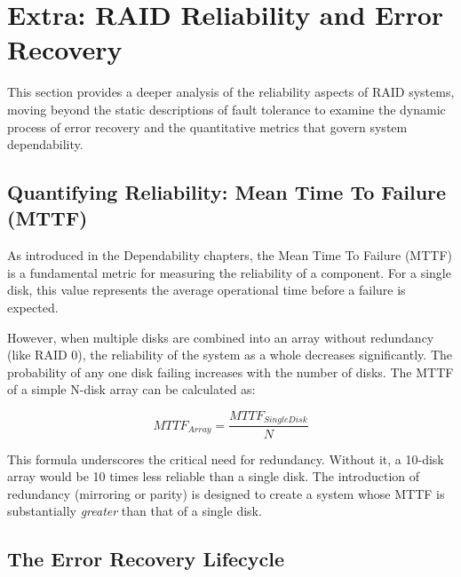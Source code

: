 \chapter*{Extra: RAID Reliability and Error Recovery}
\label{chap:extra_raid_reliability}

This section provides a deeper analysis of the reliability aspects of RAID systems, moving beyond the static descriptions of fault tolerance to examine the dynamic process of error recovery and the quantitative metrics that govern system dependability.

\section{Quantifying Reliability: Mean Time To Failure (MTTF)}

As introduced in the Dependability chapters, the Mean Time To Failure (MTTF) is a fundamental metric for measuring the reliability of a component. For a single disk, this value represents the average operational time before a failure is expected.

However, when multiple disks are combined into an array without redundancy (like RAID 0), the reliability of the system as a whole decreases significantly. The probability of any one disk failing increases with the number of disks. The MTTF of a simple N-disk array can be calculated as:

\begin{equation}
    MTTF_{Array} = \frac{MTTF_{SingleDisk}}{N}
\end{equation}

This formula underscores the critical need for redundancy. Without it, a 10-disk array would be 10 times less reliable than a single disk. The introduction of redundancy (mirroring or parity) is designed to create a system whose MTTF is substantially \textit{greater} than that of a single disk.


\section{The Error Recovery Lifecycle}

